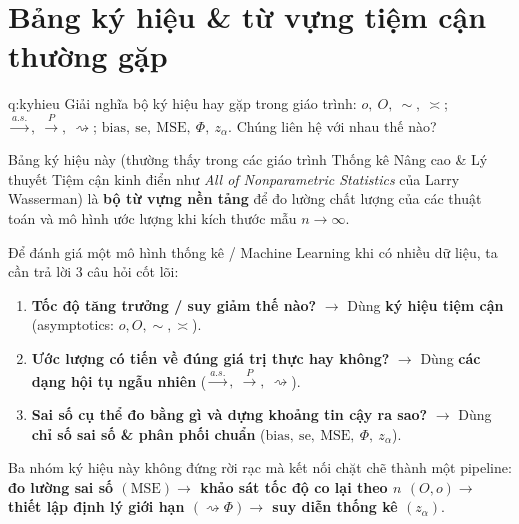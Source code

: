 \section{Bảng ký hiệu \& từ vựng tiệm cận thường gặp}

\begin{cauhoi}{q:kyhieu}
Giải nghĩa bộ ký hiệu hay gặp trong giáo trình: $o,\ O,\ \sim,\ \asymp$; $\xrightarrow{a.s.},\ \xrightarrow{P},\ \rightsquigarrow$; $\mathrm{bias},\ \mathrm{se},\ \mathrm{MSE},\ \Phi,\ z_\alpha$. Chúng liên hệ với nhau thế nào?
\end{cauhoi}

\begin{chot}
Bảng ký hiệu này (thường thấy trong các giáo trình Thống kê Nâng cao \& Lý thuyết Tiệm cận kinh điển như \textit{All of Nonparametric Statistics} của Larry Wasserman) là \textbf{bộ từ vựng nền tảng} để đo lường chất lượng của các thuật toán và mô hình ước lượng khi kích thước mẫu $n\to\infty$.
\end{chot}

Để đánh giá một mô hình thống kê / Machine Learning khi có nhiều dữ liệu, ta cần trả lời 3 câu hỏi cốt lõi:
\begin{enumerate}
\item \textbf{Tốc độ tăng trưởng / suy giảm thế nào?} $\to$ Dùng \textbf{ký hiệu tiệm cận} (asymptotics: $o,O,\sim,\asymp$).
\item \textbf{Ước lượng có tiến về đúng giá trị thực hay không?} $\to$ Dùng \textbf{các dạng hội tụ ngẫu nhiên} ($\xrightarrow{a.s.},\ \xrightarrow{P},\ \rightsquigarrow$).
\item \textbf{Sai số cụ thể đo bằng gì và dựng khoảng tin cậy ra sao?} $\to$ Dùng \textbf{chỉ số sai số \& phân phối chuẩn} ($\mathrm{bias},\ \mathrm{se},\ \mathrm{MSE},\ \Phi,\ z_\alpha$).
\end{enumerate}
Ba nhóm ký hiệu này không đứng rời rạc mà kết nối chặt chẽ thành một pipeline: \textbf{đo lường sai số $(\mathrm{MSE})\to$ khảo sát tốc độ co lại theo $n$ $(O,o)\to$ thiết lập định lý giới hạn $(\rightsquigarrow\Phi)\to$ suy diễn thống kê $(z_\alpha)$}.


